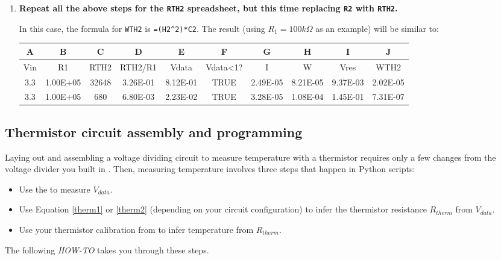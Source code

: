\begin{enumerate}
	\item \textbf{Repeat all the above steps for the \texttt{RTH2} spreadsheet, but this time replacing \texttt{R2} with \texttt{RTH2}.}

	In this case, the formula for \texttt{WTH2} is \lstinline{=(H2^2)*C2}.
	The result (using $R_1=100k\Omega$ as an example) will be similar to:
\begin{table}[H]
	\centering
	\begin{small}
		\begin{tabular}{|c|c|c|c|c|c|c|c|c|c|}
			\hline
			\textbf{A}  & \textbf{B} & \textbf{C} & \textbf{D} & \textbf{E} & \textbf{F} & \textbf{G} & \textbf{H} & \textbf{I} & \textbf{J} \\
			\hline
			Vin  & R1 & RTH2 & RTH2/R1 & Vdata & Vdata<1? & I & W & Vres & WTH2\\
			\hline
			3.3 & 1.00E+05  & 32648 & 3.26E-01 & 8.12E-01 & TRUE & 2.49E-05 & 8.21E-05 & 9.37E-03 & 2.02E-05\\
			\hline
			3.3 & 1.00E+05  & 680 & 6.80E-03 & 2.23E-02 & TRUE & 3.28E-05 & 1.08E-04 & 1.45E-01 & 7.31E-07\\
			\hline
		\end{tabular}
	\end{small}
\end{table}

\end{enumerate}


\subsection{Thermistor circuit assembly and programming}
Laying out and assembling a voltage dividing circuit to measure temperature with a thermistor requires only a few changes from the voltage divider you built in .
Then, measuring temperature involves three steps that happen in Python scripts:
\begin{itemize}
	\item Use the \adc to measure $V_{data}$.
	\item Use Equation \ref{therm1} or \ref{therm2} (depending on your circuit configuration) to infer the thermistor resistance $R_{therm}$ from $V_{data}$.
	\item Use your thermistor calibration from  to infer temperature from $R_{therm}$.
\end{itemize}
The following \textit{HOW-TO} takes you through these steps.

